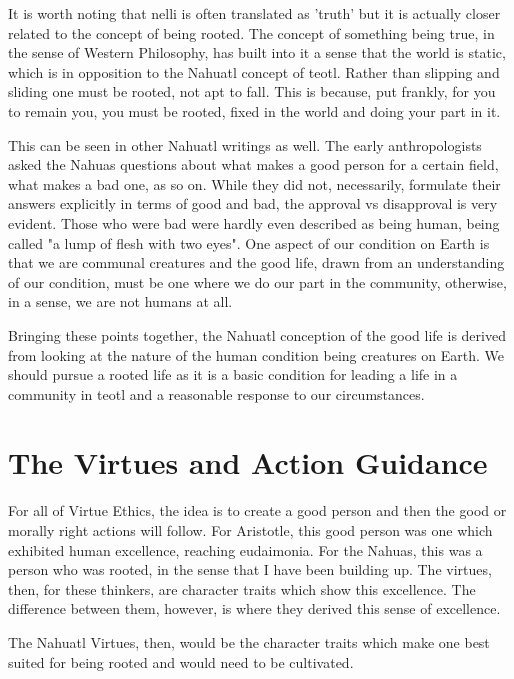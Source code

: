 It is worth noting that nelli is often translated as 'truth' but it is actually closer related to the concept of being rooted. The concept of something being true, in the sense of Western Philosophy, has built into it a sense that the world is static, which is in opposition to the Nahuatl concept of teotl. Rather than slipping and sliding one must be rooted, not apt to fall. This is because, put frankly, for you to remain you, you must be rooted, fixed in the world and doing your part in it. 

This can be seen in other Nahuatl writings as well. The early anthropologists asked the Nahuas questions about what makes a good person for a certain field, what makes a bad one, as so on. While they did not, necessarily, formulate their answers explicitly in terms of good and bad, the approval vs disapproval is very evident. Those who were bad were hardly even described as being human, being called "a lump of flesh with two eyes".  One aspect of our condition on Earth is that we are communal creatures and the good life, drawn from an understanding of our condition, must be one where we do our part in the community, otherwise, in a sense, we are not humans at all. 

Bringing these points together, the Nahuatl conception of the good life is derived from looking at the nature of the human condition being creatures on Earth. We should pursue a rooted life as it is a basic condition for leading a life in a community in teotl and a reasonable response to our circumstances.
\section{The Virtues and Action Guidance}

For all of Virtue Ethics, the idea is to create a good person and then the good or morally right actions will follow. For Aristotle, this good person was one which exhibited human excellence, reaching eudaimonia. For the Nahuas, this was a person who was rooted, in the sense that I have been building up.  The virtues, then, for these thinkers, are character traits which show this excellence. The difference between them, however, is where they derived this sense of excellence. 

The Nahuatl Virtues, then, would be the character traits which make one best suited for being rooted and would need to be cultivated. 


